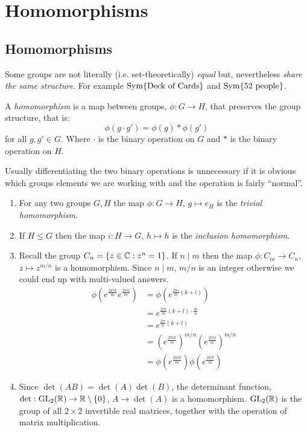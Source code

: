 \documentclass[../main.tex]{subfiles}
\begin{document}
\chapter{Homomorphisms}
\section{Homomorphisms}
Some groups are not literally (i.e. set-theoretically) \textit{equal} but, nevertheless \textit{share the same structure}.
For example $\operatorname{Sym}\{\text{Deck of Cards}\}$ and $\operatorname{Sym}\{\text{52 people}\}$.
\begin{definition}[Homomorphims]
  A \textit{homomorphism} is a map between groups, $\phi: G \to H$, that preserves the group structure, that is:
  \[
    \phi(g \cdot g') = \phi(g) * \phi(g')
  \]
  for all $g, g' \in G$. Where $\cdot$ is the binary operation on $G$ and $*$ is the binary operation on $H$.
\end{definition}
\begin{remark}[Notation]
  Usually differentiating the two binary operations is unnecessary if it is obvious which groups elements we are working with and the operation is fairly ``normal''.
\end{remark}
\begin{example}
  \begin{enumerate}
    \item For any two groups $G, H$ the map $\phi: G \to H$, $g \mapsto e_H$ is the \textit{trivial homomorphism}.
    \item If $H \leq G$ then the map $i: H \to G$, $h \mapsto h$ is the \textit{inclusion homomorphism}.
    \item Recall the group $C_n = \{z \in \mathbb{C} : z^{n} = 1\}$.
          If $n \mid m$ then the map $\phi: C_m \to C_n$, $z \mapsto z^{m/n}$ is a homomorphism.
          Since $n \mid m$, $m/n$ is an integer otherwise we could end up with multi-valued answers.
          \begin{align*}
            \phi\left(e^{\frac{2\pi i k}{m}} e^{\frac{2 \pi i l}{m}}\right) &= \phi\left(e^{\frac{2\pi i}{m}(k + l)}\right) \\
                                                                            &= e^{\frac{2\pi i}{m}(k + l)\cdot \frac{m}{n}} \\
                                                                            &= e^{\frac{2\pi}{n}(k + l)} \\
                                                                            &= \left(e^{\frac{2 \pi i k}{m}}\right)^{m/n} \left(e^{\frac{2 \pi i l}{m}}\right)^{m/n} \\
                                                                            &= \phi\left(e^{\frac{2\pi i k}{m}}\right) \phi\left(e^{\frac{2\pi i l}{m}}\right)
          \end{align*}
    \item Since $\det(AB) = \det(A)\det(B)$, the determinant function, $\det: \mathrm{GL}_2(\mathbb{R}) \to \mathbb{R} \setminus \{0\}$, $A \to \det(A)$ is a homomorphism.
          $\mathrm{GL}_2(\mathbb{R})$ is the group of all $2\times2$ invertible real matrices, together with the operation of matrix multiplication.
  \end{enumerate}
\end{example}
\end{document}
